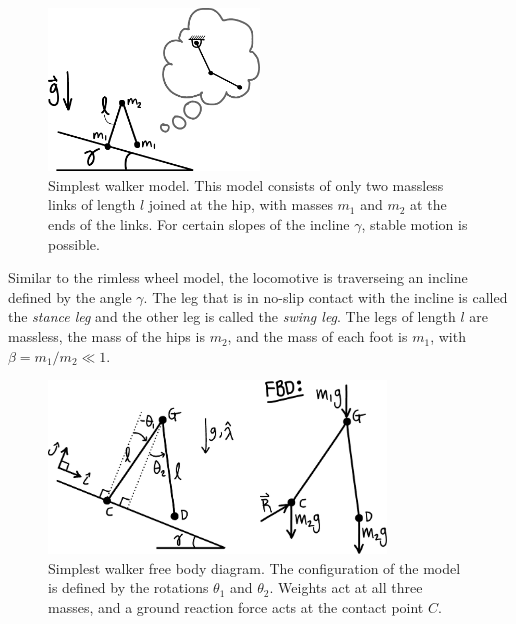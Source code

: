 \begin{figure}[h]		%
\begin{centering}
\includegraphics[width=0.5\textwidth]{Figures/SimplestWalkerPendulum}\par
\end{centering}
\caption[Diagram: Simplest Walker Model]{Simplest walker model. This model consists of only two massless links of length $l$ joined at the hip, with masses $m_{1}$ and $m_{2}$ at the ends of the links. For certain slopes of the incline $\gamma$, stable motion is possible.}
\label{fig:SimplestWalkerPendulum}
\end{figure}
%

Similar to the rimless wheel model, the locomotive is traverseing an incline defined by the angle $\gamma$. The leg that is in no-slip contact with the incline is called the \textit{stance leg} and the other leg is called the \textit{swing leg}. The legs of length $l$ are massless, the mass of the hips is $m_{2}$, and the mass of each foot is $m_{1}$, with $\beta = m_{1} / m_{2} \ll 1$.

\begin{figure}[h]		%
\begin{centering}
\includegraphics[width=0.8\textwidth]{Figures/SimplestWalkerFBD}\par
\end{centering}
\caption[Diagram: Simplest Walker Free Body Diagram]{Simplest walker free body diagram. The configuration of the model is defined by the rotations $\theta_{1}$ and $\theta_{2}$. Weights act at all three masses, and a ground reaction force acts at the contact point $C$.}
\label{fig:SimplestWalkerFBD}
\end{figure}
%

